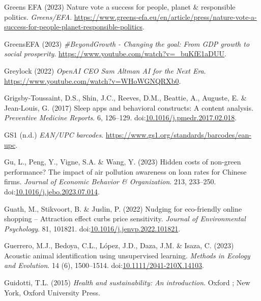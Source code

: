 \documentclass[
  letterpaper,
  DIV=11,
  numbers=noendperiod]{scrartcl}
\newlength{\cslhangindent}
\newenvironment{CSLReferences}[2] %
 {\begin{list}{}{%
  \setlength{\itemindent}{0pt}
  \setlength{\leftmargin}{0pt}
  \setlength{\parsep}{0pt}
  \ifodd #1
   \setlength{\leftmargin}{\cslhangindent}
   \setlength{\itemindent}{-1\cslhangindent}
  \fi
  \setlength{\itemsep}{#2\baselineskip}}}
 {\end{list}}
\begin{document}
\begin{CSLReferences}{0}{1}
Greens EFA (2023) Nature vote a success for people, planet \&
responsible politics. \emph{Greens/EFA}.
\url{https://www.greens-efa.eu/en/article/press/nature-vote-a-success-for-people-planet-responsible-politics}.

GreensEFA (2023) \emph{\#{BeyondGrowth} - {Changing} the goal: From
{GDP} growth to social prosperity}.
\url{https://www.youtube.com/watch?v=_buKfE1aDUU}.

Greylock (2022) \emph{{OpenAI CEO Sam Altman} {\textbar} {AI} for the
{Next Era}}. \url{https://www.youtube.com/watch?v=WHoWGNQRXb0}.

Grigsby-Toussaint, D.S., Shin, J.C., Reeves, D.M., Beattie, A., Auguste,
E. \& Jean-Louis, G. (2017) Sleep apps and behavioral constructs: {A}
content analysis. \emph{Preventive Medicine Reports}. 6, 126--129.
doi:\href{https://doi.org/10.1016/j.pmedr.2017.02.018}{10.1016/j.pmedr.2017.02.018}.

GS1 (n.d.) \emph{{EAN}/{UPC} barcodes}.
\url{https://www.gs1.org/standards/barcodes/ean-upc}.

Gu, L., Peng, Y., Vigne, S.A. \& Wang, Y. (2023) Hidden costs of
non-green performance? {The} impact of air pollution awareness on loan
rates for {Chinese} firms. \emph{Journal of Economic Behavior \&
Organization}. 213, 233--250.
doi:\href{https://doi.org/10.1016/j.jebo.2023.07.014}{10.1016/j.jebo.2023.07.014}.

Guath, M., Stikvoort, B. \& Juslin, P. (2022) Nudging for eco-friendly
online shopping -- {Attraction} effect curbs price sensitivity.
\emph{Journal of Environmental Psychology}. 81, 101821.
doi:\href{https://doi.org/10.1016/j.jenvp.2022.101821}{10.1016/j.jenvp.2022.101821}.

Guerrero, M.J., Bedoya, C.L., López, J.D., Daza, J.M. \& Isaza, C.
(2023) Acoustic animal identification using unsupervised learning.
\emph{Methods in Ecology and Evolution}. 14 (6), 1500--1514.
doi:\href{https://doi.org/10.1111/2041-210X.14103}{10.1111/2041-210X.14103}.

Guidotti, T.L. (2015) \emph{Health and sustainability: An introduction}.
Oxford ; New York, Oxford University Press.


\end{CSLReferences}
\end{document}
